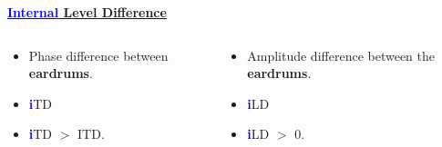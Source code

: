 \documentclass{beamer}
\begin{document}
\begin{frame}[t]
{\begin{exampleblock}{}
\begin{columns}
    \begin{column}{0.5\textwidth}
    \centering
    \underline{\textbf{\textcolor{blue}{Internal} Level Difference}}
    \end{column}
    
  \end{columns}
  
    \begin{columns}
 
    \begin{column}{0.5\textwidth}
    \small
     \begin{itemize}
    \item[] Phase difference between \textbf{eardrums}.
    \item \textbf{\textcolor{blue}{i}}TD
    \item \textbf{\textcolor{blue}{i}}TD $>$ ITD.
     \end{itemize}
    \end{column}
     
    \begin{column}{0.5\textwidth}
    \small
     \begin{itemize}
          \item[] Amplitude difference between the \textbf{eardrums}.
          \item \textbf{\textcolor{blue}{i}}LD
          \item \textbf{\textcolor{blue}{i}}LD $>$ 0.
     \end{itemize}
    \end{column}
    
  \end{columns}
  \end{exampleblock}}
\end{frame}
  
\end{document}
